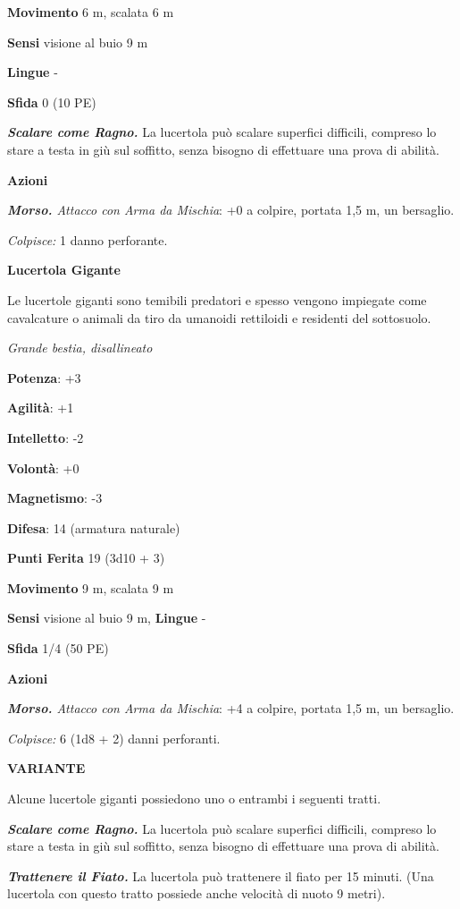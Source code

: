 \begin{multicols}{2}
\textbf{Movimento} 6 m, scalata 6 m

\textbf{Sensi} visione al buio 9 m

\textbf{Lingue} -

\textbf{Sfida} 0 (10 PE)

\emph{\textbf{Scalare come Ragno.}} La lucertola può scalare superfici
difficili, compreso lo stare a testa in giù sul soffitto, senza bisogno
di effettuare una prova di abilità.

\textbf{Azioni}

\emph{\textbf{Morso.} Attacco con Arma da Mischia}: +0 a colpire,
portata 1,5 m, un bersaglio.

\emph{Colpisce:} 1 danno perforante.

\textbf{Lucertola Gigante}

Le lucertole giganti sono temibili predatori e spesso vengono impiegate
come cavalcature o animali da tiro da umanoidi rettiloidi e residenti
del sottosuolo.

\emph{Grande bestia, disallineato}

\textbf{Potenza}: +3

\textbf{Agilità}: +1

\textbf{Intelletto}: -2

\textbf{Volontà}: +0

\textbf{Magnetismo}: -3

\textbf{Difesa}: 14 (armatura naturale)

\textbf{Punti Ferita} 19 (3d10 + 3)

\textbf{Movimento} 9 m, scalata 9 m

\textbf{Sensi} visione al buio 9 m, 
\textbf{Lingue} -

\textbf{Sfida} 1/4 (50 PE)

\textbf{Azioni}

\emph{\textbf{Morso.} Attacco con Arma da Mischia}: +4 a colpire,
portata 1,5 m, un bersaglio.

\emph{Colpisce:} 6 (1d8 + 2) danni perforanti.

\textbf{VARIANTE}

Alcune lucertole giganti possiedono uno o entrambi i seguenti tratti.

\emph{\textbf{Scalare come Ragno.}} La lucertola può scalare superfici
difficili, compreso lo stare a testa in giù sul soffitto, senza bisogno
di effettuare una prova di abilità.

\emph{\textbf{Trattenere il Fiato.}} La lucertola può trattenere il
fiato per 15 minuti. (Una lucertola con questo tratto possiede anche
velocità di nuoto 9 metri).


\end{multicols}
